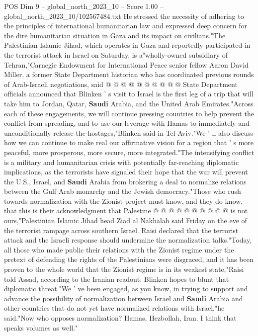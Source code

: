 \begin{textsample}{POS Dim 9 – global\_north\_2023\_10 – Score 1.00 – global\_north\_2023\_10/102567484.txt}
He stressed the necessity of adhering to the principles of international humanitarian law and expressed deep concern for the dire humanitarian situation in Gaza and its impact on civilians."The Palestinian Islamic Jihad, which operates in Gaza and reportedly participated in the terrorist attack in Israel on Saturday, is a"wholly-owned subsidiary of Tehran,"Carnegie Endowment for International Peace senior fellow Aaron David Miller, a former State Department historian who has coordinated previous rounds of Arab-Israeli negotiations, said @ @ @ @ @ @ @ @ @ @ State Department officials announced that Blinken ' s visit to Israel is the first leg of a trip that will take him to Jordan, Qatar, \textbf{Saudi} Arabia, and the United Arab Emirates."Across each of these engagements, we will continue pressing countries to help prevent the conflict from spreading, and to use our leverage with Hamas to immediately and unconditionally release the hostages,"Blinken said in Tel Aviv."We ' ll also discuss how we can continue to make real our affirmative vision for a region that ' s more peaceful, more prosperous, more secure, more integrated."The intensifying conflict is a military and humanitarian crisis with potentially far-reaching diplomatic implications, as the terrorists have signaled their hope that the war will prevent the U.S., Israel, and \textbf{Saudi} Arabia from brokering a deal to normalize relations between the Gulf Arab monarchy and the Jewish democracy."Those who rush towards normalization with the Zionist project must know, and they do know, that this is their acknowledgment that Palestine @ @ @ @ @ @ @ @ @ @ is not ours,"Palestinian Islamic Jihad head Ziad al Nakhalah said Friday on the eve of the terrorist rampage across southern Israel.
Raisi declared that the terrorist attack and the Israeli response should undermine the normalization talks."Today, all those who made public their relations with the Zionist regime under the pretext of defending the rights of the Palestinians were disgraced, and it has been proven to the whole world that the Zionist regime is in its weakest state,"Raisi told Assad, according to the Iranian readout.
Blinken hopes to blunt that diplomatic threat."We ' ve been engaged, as you know, in trying to support and advance the possibility of normalization between Israel and \textbf{Saudi} Arabia and other countries that do not yet have normalized relations with Israel,"he said."Now who opposes normalization?
Hamas, Hezbollah, Iran.
I think that speaks volumes as well."

\end{textsample}

